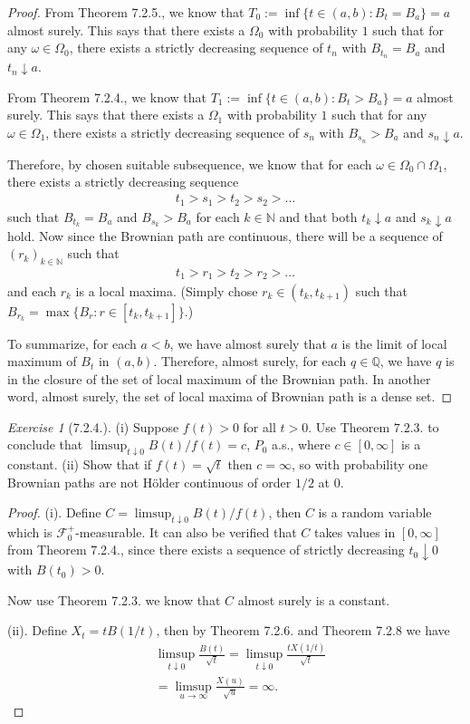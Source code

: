 \documentclass[12pt,a4paper]{amsart}
\theoremstyle{plain}
\theoremstyle{definition}
\theoremstyle{remark}
\newtheorem*{exe}{Exercise}
\numberwithin{equation}{section}
\begin{document}
\begin{proof}
From Theorem 7.2.5., we know that $T_0:= \inf\{t \in (a,b): B_t = B_a\} = a$ almost surely. This says that there exists a $\Omega_0$ with probability $1$ such that for any $\omega \in \Omega_0$, there exists a strictly decreasing sequence of $t_n$ with $B_{t_n} = B_a$ and $t_n \downarrow a$.

From Theorem 7.2.4., we know that $T_1:= \inf\{t \in (a,b): B_t > B_a\} = a$ almost surely. This says that there exists a $\Omega_1$ with probability $1$ such that for any $\omega \in \Omega_1$, there exists a strictly decreasing sequence of $s_n$ with $B_{s_n} > B_a$ and $s_n \downarrow a$.

Therefore, by chosen suitable subsequence, we know that for each $\omega \in \Omega_0 \cap \Omega_1$, there exists a strictly decreasing sequence
\begin{align}
t_1 > s_1 > t_2 > s_2 > \dots 
\end{align}
such that $B_{t_k} = B_a$ and $B_{s_k} > B_a$ for each $k \in \mathbb N$ and that both $t_k \downarrow a$ and $s_k \downarrow a$ hold.
Now since the Brownian path are continuous, there will be a sequence of $(r_k)_{k\in \mathbb N}$ such that
\begin{align}
t_1 > r_1 > t_2 > r_2 > \dots
\end{align}
and each $r_k$ is a local maxima. (Simply chose $r_k\in (t_k, t_{k+1})$ such that $B_{r_k} = \max\{ B_r: r\in [t_k, t_{k+1}] \}$.)

To summarize, for each $a< b$, we have almost surely that $a$ is the limit of local maximum of $B_t$ in $(a,b)$.
Therefore, almost surely, for each $q\in \mathbb Q$, we have $q$ is in the closure of the set of local maximum of the Brownian path. 
In another word, almost surely, the set of local maxima of Brownian path is a dense set.
\end{proof}
\begin{exe}[7.2.4.]
(i) Suppose $f(t)>0$ for all $t>0$. 
Use Theorem $7.2.3.$ to conclude that $\limsup_{t\downarrow 0}B(t)/f(t) = c$, $P_0$ a.s., where $c \in [0,\infty]$ is a constant.
(ii) Show that if $f(t) = \sqrt{t}$ then $c = \infty$, so with probability one Brownian paths are not H\"older continuous of order $1/2$ at $0$. 
\end{exe}
\begin{proof}
(i). Define $C = \limsup_{t\downarrow 0} B(t)/f(t)$, then $C$ is a random variable which is $\mathcal F_0^+$-measurable. It can also be verified that $C$ takes values in $[0, \infty]$ from Theorem 7.2.4., since there exists a sequence of strictly decreasing $t_0 \downarrow 0$ with $B(t_0)>0$.

Now use Theorem 7.2.3. we know that $C$ almost surely is a constant.

(ii). Define $X_t = t B(1/t)$, then by Theorem 7.2.6. and Theorem 7.2.8 we have
\begin{align}
&\limsup_{t\downarrow 0} \frac{B(t)}{ \sqrt{t}} 
  = \limsup_{t\downarrow 0} \frac{t X(1/t)}{\sqrt{t}}
\\&= \limsup_{u\to \infty} \frac{X(u)}{\sqrt{u}}
= \infty.
\end{align}
\end{proof}
\end{document}
